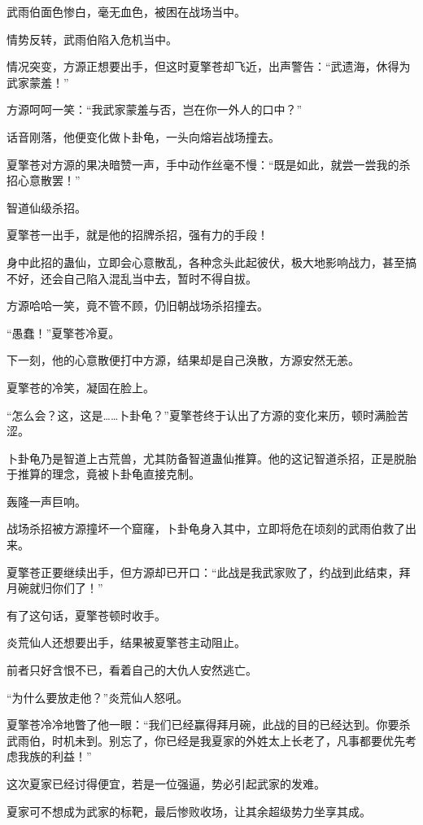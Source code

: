 \begin{this_body}
武雨伯面色惨白，毫无血色，被困在战场当中。

情势反转，武雨伯陷入危机当中。

情况突变，方源正想要出手，但这时夏擎苍却飞近，出声警告：“武遗海，休得为武家蒙羞！”

方源呵呵一笑：“我武家蒙羞与否，岂在你一外人的口中？”

话音刚落，他便变化做卜卦龟，一头向熔岩战场撞去。

夏擎苍对方源的果决暗赞一声，手中动作丝毫不慢：“既是如此，就尝一尝我的杀招心意散罢！”

智道仙级杀招。

夏擎苍一出手，就是他的招牌杀招，强有力的手段！

身中此招的蛊仙，立即会心意散乱，各种念头此起彼伏，极大地影响战力，甚至搞不好，还会自己陷入混乱当中去，暂时不得自拔。

方源哈哈一笑，竟不管不顾，仍旧朝战场杀招撞去。

“愚蠢！”夏擎苍冷夏。

下一刻，他的心意散便打中方源，结果却是自己涣散，方源安然无恙。

夏擎苍的冷笑，凝固在脸上。

“怎么会？这，这是……卜卦龟？”夏擎苍终于认出了方源的变化来历，顿时满脸苦涩。

卜卦龟乃是智道上古荒兽，尤其防备智道蛊仙推算。他的这记智道杀招，正是脱胎于推算的理念，竟被卜卦龟直接克制。

轰隆一声巨响。

战场杀招被方源撞坏一个窟窿，卜卦龟身入其中，立即将危在顷刻的武雨伯救了出来。

夏擎苍正要继续出手，但方源却已开口：“此战是我武家败了，约战到此结束，拜月碗就归你们了！”

有了这句话，夏擎苍顿时收手。

炎荒仙人还想要出手，结果被夏擎苍主动阻止。

前者只好含恨不已，看着自己的大仇人安然逃亡。

“为什么要放走他？”炎荒仙人怒吼。

夏擎苍冷冷地瞥了他一眼：“我们已经赢得拜月碗，此战的目的已经达到。你要杀武雨伯，时机未到。别忘了，你已经是我夏家的外姓太上长老了，凡事都要优先考虑我族的利益！”

这次夏家已经讨得便宜，若是一位强逼，势必引起武家的发难。

夏家可不想成为武家的标靶，最后惨败收场，让其余超级势力坐享其成。

\end{this_body}

